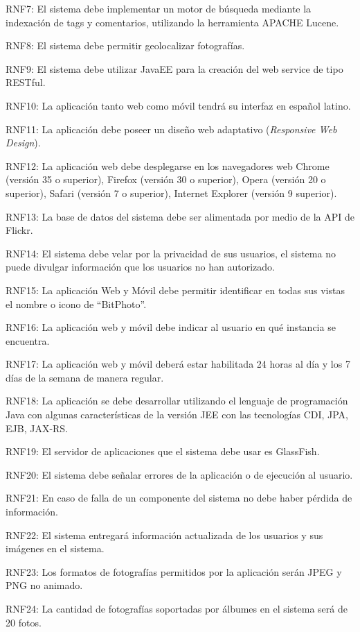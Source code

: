 \documentclass{memoria}
\begin{document}
RNF7: El sistema debe implementar un motor de búsqueda mediante la indexación de tags y comentarios, utilizando la  herramienta APACHE Lucene.

RNF8: El sistema debe permitir geolocalizar fotografías.

RNF9: El sistema debe utilizar JavaEE para la creación del web service de tipo RESTful.

RNF10: La aplicación tanto web como móvil tendrá su interfaz en español latino.

RNF11: La aplicación debe poseer un diseño web adaptativo (\textsl{Responsive Web Design}).

RNF12: La aplicación web debe desplegarse en los navegadores web Chrome (versión 35 o superior), Firefox (versión 30 o superior), Opera (versión 20 o superior), Safari (versión 7 o superior), Internet Explorer (versión 9 superior).

RNF13: La base de datos del sistema debe ser alimentada por medio de la API de Flickr.

RNF14: El sistema debe velar por la privacidad de sus usuarios, el sistema no puede divulgar información que los usuarios no han autorizado.

RNF15: La aplicación Web y Móvil debe permitir identificar en todas sus vistas el nombre o icono de “BitPhoto”.

RNF16: La aplicación web y móvil debe indicar al usuario en qué instancia se encuentra.

RNF17: La aplicación web y móvil deberá estar habilitada 24 horas al día y los 7 días de la semana de manera regular.

RNF18: La aplicación se debe desarrollar utilizando el lenguaje de programación Java con algunas características de la versión JEE con las tecnologías CDI, JPA, EJB, JAX-RS.

RNF19: El servidor de aplicaciones que el sistema debe usar es GlassFish.

RNF20: El sistema debe señalar errores de la aplicación o de ejecución al usuario.

RNF21: En caso de falla de un componente del sistema no debe haber pérdida de información.

RNF22: El sistema entregará información actualizada de los usuarios y sus imágenes en  el sistema.

RNF23: Los formatos de fotografías permitidos por la aplicación serán JPEG y PNG no animado.

RNF24: La cantidad de fotografías soportadas por álbumes en el sistema será de 20 fotos.
\end{document}
